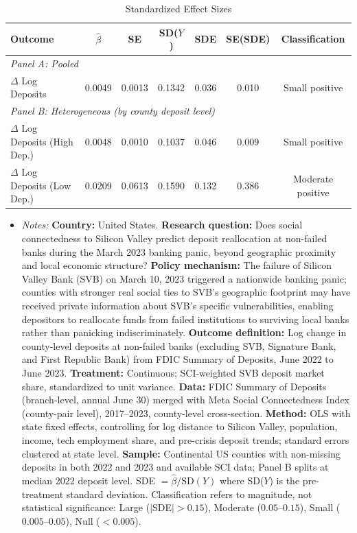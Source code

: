 \begin{table}[htbp]
\centering
\caption{Standardized Effect Sizes}
\label{tab:sde}
\footnotesize\begin{tabular}{lcccccc}
\hline\hline
Outcome & $\hat{\beta}$ & SE & SD($Y$) & SDE & SE(SDE) & Classification \\
\hline
\multicolumn{7}{l}{\textit{Panel A: Pooled}} \\
$\Delta$ Log Deposits & 0.0049 & 0.0013 & 0.1342 & 0.036 & 0.010 & Small positive \\
\hline
\multicolumn{7}{l}{\textit{Panel B: Heterogeneous (by county deposit level)}} \\
$\Delta$ Log Deposits (High Dep.) & 0.0048 & 0.0010 & 0.1037 & 0.046 & 0.009 & Small positive \\
$\Delta$ Log Deposits (Low Dep.) & 0.0209 & 0.0613 & 0.1590 & 0.132 & 0.386 & Moderate positive \\
\hline\hline
\end{tabular}
\begin{itemize}[leftmargin=*,nosep]
\item \textit{Notes:} \textbf{Country:} United States. \textbf{Research question:} Does social connectedness to Silicon Valley predict deposit reallocation at non-failed banks during the March 2023 banking panic, beyond geographic proximity and local economic structure? \textbf{Policy mechanism:} The failure of Silicon Valley Bank (SVB) on March 10, 2023 triggered a nationwide banking panic; counties with stronger real social ties to SVB's geographic footprint may have received private information about SVB's specific vulnerabilities, enabling depositors to reallocate funds from failed institutions to surviving local banks rather than panicking indiscriminately. \textbf{Outcome definition:} Log change in county-level deposits at non-failed banks (excluding SVB, Signature Bank, and First Republic Bank) from FDIC Summary of Deposits, June 2022 to June 2023. \textbf{Treatment:} Continuous; SCI-weighted SVB deposit market share, standardized to unit variance. \textbf{Data:} FDIC Summary of Deposits (branch-level, annual June 30) merged with Meta Social Connectedness Index (county-pair level), 2017--2023, county-level cross-section. \textbf{Method:} OLS with state fixed effects, controlling for log distance to Silicon Valley, population, income, tech employment share, and pre-crisis deposit trends; standard errors clustered at state level. \textbf{Sample:} Continental US counties with non-missing deposits in both 2022 and 2023 and available SCI data; Panel B splits at median 2022 deposit level. SDE $= \hat{\beta} / \text{SD}(Y)$ where SD($Y$) is the pre-treatment standard deviation. Classification refers to magnitude, not statistical significance: Large ($|$SDE$| > 0.15$), Moderate ($0.05$--$0.15$), Small ($0.005$--$0.05$), Null ($< 0.005$).
\end{itemize}
\end{table}
